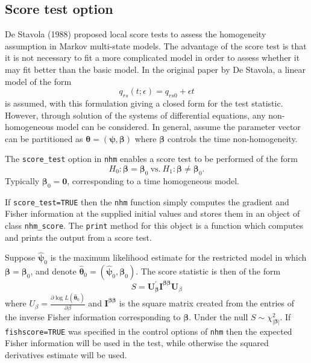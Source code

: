 \documentclass{article}
\numberwithin{equation}{section}
\begin{document}
\subsection{Score test option}
\label{sec:scoretest}

De Stavola (1988) \cite{stavola} proposed local score tests to assess the homogeneity assumption in Markov multi-state models. The advantage of the score test is that it is not necessary to fit a more complicated model in order to assess whether it may fit better than the basic model. In the original paper by De Stavola, a linear model of the form
$$q_{rs}(t; \epsilon) = q_{rs0} + \epsilon t$$
is assumed, with this formulation giving a closed form for the test statistic. However, through solution of the systems of differential equations, any non-homogeneous model can be considered. In general, assume the parameter vector can be partitioned as $\bm\theta = (\bm\psi , \bm\beta)$ where $\bm\beta$ controls the time non-homogeneity.

The \verb!score_test! option in \verb!nhm! enables a score test to be performed of the form
\begin{equation}H_0 : \bm\beta  = \bm\beta_0 ~\mbox{vs.}~ H_1: \bm\beta \neq \bm\beta_0 \label{scoretest}.\end{equation} Typically $\bm\beta_0 = \mathbf{0}$, corresponding to a time homogeneous model.

If \verb!score_test=TRUE! then the \verb!nhm! function simply computes the gradient and Fisher information at the supplied initial values and stores them in an object of class \verb!nhm_score!. The \verb!print! method for this object is a function which computes and prints the output from a score test.  

Suppose $\hat{\bm\psi}_0$ is the maximum likelihood estimate for the restricted model in which $\bm\beta = \bm\beta_0$, and denote $\hat{\bm\theta}_0 = (\hat{\bm\psi}_0, \bm\beta_0)$. 
The score statistic is then of the form
$$S = \mathbf{U}^{'}_{\bm\beta} \mathbf{I}^{\bm\beta \bm\beta} \mathbf{U}_{\beta}$$ where
$U_\beta = \frac{\partial \log L(\hat{\bm\theta}_0)}{\partial \beta}$ and $\mathbf{I}^{\bm\beta \bm\beta}$ is the square matrix created from the entries of the inverse Fisher information corresponding to $\bm\beta$.
Under the null $S \sim \chi^2_{|\bm\beta|}$. If \verb!fishscore=TRUE! was specified in the control options of \verb!nhm! then the expected Fisher information will be used in the test, while otherwise the squared derivatives estimate will be used.
\end{document}
